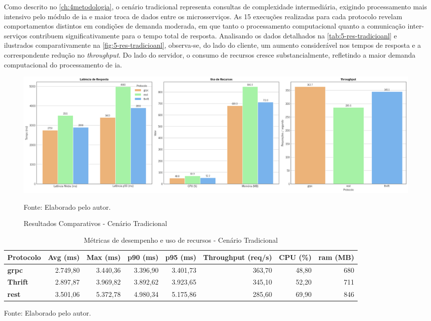 Como descrito no \autoref{ch:4metodologia}, o cenário tradicional representa consultas de complexidade intermediária, exigindo processamento mais intensivo pelo módulo de \acrfull{ia} e maior troca de dados entre os microsserviços. As 15 execuções realizadas para cada protocolo revelam comportamentos distintos em condições de demanda moderada, em que tanto o processamento computacional quanto a comunicação inter-serviços contribuem significativamente para o tempo total de resposta. Analisando os dados detalhados na \autoref{tab:5-res-tradicioanl} e ilustrados comparativamente na \autoref{fig:5-res-tradicioanl}, observa-se, do lado do cliente, um aumento considerável nos tempos de resposta e a correspondente redução no \textit{throughput}. Do lado do servidor, o consumo de recursos cresce substancialmente, refletindo a maior demanda computacional do processamento de \gls{ia}.

\begin{figure}[H]
    \caption{Resultados Comparativos - Cenário Tradicional}
    \label{fig:5-res-tradicioanl}
    \centering
    \includegraphics[width=1\linewidth]{imagens/resultados/5-resultados-tradicional.png}    
    {\par \raggedright \footnotesize Fonte: Elaborado pelo autor.\par}
\end{figure}


\begin{table}[H]
\centering
\caption{Métricas de desempenho e uso de recursos - Cenário Tradicional}
\label{tab:5-res-tradicioanl}
\begin{tabular}[\linewidth]{lrrrrrrr}
\hline
Protocolo & Avg (ms) & Max (ms) & p90 (ms) & p95 (ms) & Throughput (req/s) & CPU (\%) & \acrshort{ram} (MB) \\
\hline
\textbf{\acrshort{grpc}}   & 2.749,80 & 3.440,36 & 3.396,90 & 3.401,73 & 363,70 & 48,80 & 680 \\
\textbf{Thrift} & 2.897,87 & 3.969,82 & 3.892,62 & 3.923,65 & 345,10 & 52,20 & 711 \\
\textbf{\gls{rest}}   & 3.501,06 & 5.372,78 & 4.980,34 & 5.175,86 & 285,60 & 69,90 & 846 \\
\hline
\end{tabular}
{\par \raggedright \footnotesize Fonte: Elaborado pelo autor.\par}
\end{table}

